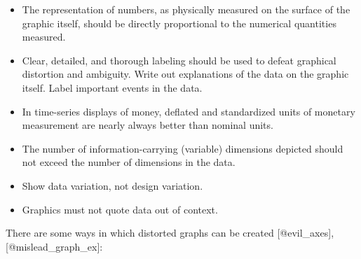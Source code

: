 \documentclass[]{book}
\providecommand{\tightlist}{%
  \setlength{\itemsep}{0pt}\setlength{\parskip}{0pt}}
\theoremstyle{definition}
\theoremstyle{definition}
\theoremstyle{definition}
\theoremstyle{remark}
\begin{document}
\begin{itemize}
\tightlist
\item
  The representation of numbers, as physically measured on the surface
  of the graphic itself, should be directly proportional to the
  numerical quantities measured.
\item
  Clear, detailed, and thorough labeling should be used to defeat
  graphical distortion and ambiguity. Write out explanations of the data
  on the graphic itself. Label important events in the data.
\item
  In time-series displays of money, deﬂated and standardized units of
  monetary measurement are nearly always better than nominal units.
\item
  The number of information-carrying (variable) dimensions depicted
  should not exceed the number of dimensions in the data.
\item
  Show data variation, not design variation.
\item
  Graphics must not quote data out of context.
\end{itemize}

There are some ways in which distorted graphs can be created
{[}@evil\_axes{]},{[}@mislead\_graph\_ex{]}:
\end{document}
